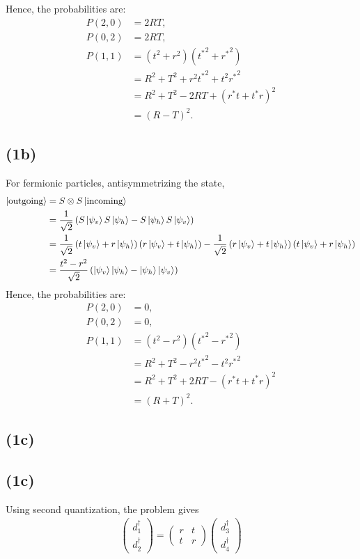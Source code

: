 \documentclass[a4paper,11pt]{article}
\begin{document}
Hence, the probabilities are:
\begin{align}
    P(2, 0) &= 2RT, \\
    P(0, 2) &= 2RT, \\
    P(1, 1) &= (t^2 + r^2)({t^*}^2 + {r^*}^2) \\
    &= R^2 + T^2 + r^2{t^*}^2 + t^2{r^*}^2 \\
    &= R^2 + T^2 - 2RT + (r^*t + t^*r)^2 \\
    &= (R - T)^2.
\end{align}

\subsection{(1b)}

For fermionic particles, antisymmetrizing the state,
\begin{align}
    \ket{\text{outgoing}} 
    &= S\otimes S \ket{\text{incoming}} \\
    &= \frac{1}{\sqrt{2}}\left(S\ket{\psi_v}S\ket{\psi_h} - S\ket{\psi_h}S\ket{\psi_v}\right) \\
    &= \frac{1}{\sqrt{2}}\left(t\ket{\psi_v} + r\ket{\psi_h}\right)\left(r\ket{\psi_v} + t\ket{\psi_h}\right) - \frac{1}{\sqrt{2}}\left(r\ket{\psi_v} + t\ket{\psi_h}\right)\left(t\ket{\psi_v} + r\ket{\psi_h}\right) \\
    &= \frac{t^2 - r^2}{\sqrt{2}}\left(\ket{\psi_v}\ket{\psi_h} - \ket{\psi_h}\ket{\psi_v}\right)
\end{align}
Hence, the probabilities are:
\begin{align}
    P(2, 0) &= 0, \\
    P(0, 2) &= 0, \\
    P(1, 1) &= (t^2 - r^2)({t^*}^2 - {r^*}^2) \\
    &= R^2 + T^2 - r^2{t^*}^2 - t^2{r^*}^2 \\
    &= R^2 + T^2 + 2RT - (r^*t + t^*r)^2 \\
    &= (R + T)^2.
\end{align}


\subsection{(1c)}

\subsection{(1c)}

Using second quantization, the problem gives
\begin{eqnarray}
    \begin{pmatrix}
        d_1^\dagger \\
        d_2^\dagger
    \end{pmatrix}
    =
    \begin{pmatrix}
        r & t \\
        t & r
    \end{pmatrix}
    \begin{pmatrix}
        d_3^\dagger \\
        d_4^\dagger
    \end{pmatrix}
\end{eqnarray}
\end{document}
